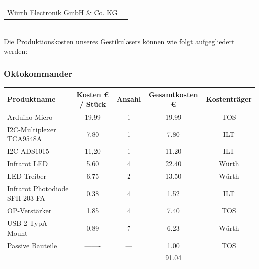 \begin{tabularx}{\textwidth}{r c}
	\vspace{1.5cm} & \\
	Würth Electronik GmbH \& Co. KG & \noindent\parbox[c]{\hsize}{\includegraphics[scale=0.05]{../Logos/Wuerth.png}}
\end{tabularx} \\

\newpage
\noindent
Die Produktionskosten unseres Gestikulasers können wie folgt aufgegliedert werden:

\subsubsection*{Oktokommander} 
\begin{tabularx}{\textwidth}{L{3.5cm} | S c S c}
	Produktname		 				& {Kosten \unit{€} / Stück}	& Anzahl & {Gesamtkosten \unit{€}}	& Kostenträger \\ 
	\hline
	Arduino Micro 					& 19.99		&   1    & 19.99 	& TOS 	 \\ [2mm]
	I2C-Multiplexer TCA9548A		& 7.80    	&   1    & 7.80  	& ILT    \\ [8mm]
	I2C ADS1015						& 11,20  	&   1    & 11.20 	& ILT    \\ [2mm]
	Infrarot LED    				& 5.60		&   4    & 22.40	& Würth  \\ [2mm]
	LED Treiber     				& 6.75    	&   2    & 13.50 	& Würth  \\ [2mm]
	Infrarot Photodiode SFH 203 FA	& 0.38		&   4    & 1.52  	& ILT	 \\ [15mm] 
	OP-Verstärker    				& 1.85    	&	4    & 7.40 	& TOS    \\ [2mm]
	USB 2 TypA Mount				& 0.89    	&   7    & 6.23  	& Würth  \\ [8mm]
	Passive Bauteile    			& {-------} & {---}  & 1.00	   	& TOS    \\ [2mm]
	\hline
									&			&		 & 91.04 	&
\end{tabularx}\\

